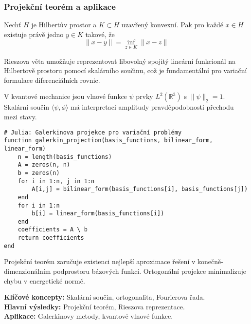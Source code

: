 \subsubsection{Projekční teorém a aplikace}

\begin{theorem}
Nechť $H$ je Hilbertův prostor a $K \subset H$ uzavřený konvexní. Pak pro každé $x \in H$ existuje právě jedno $y \in K$ takové, že
\[
\|x - y\| = \inf_{z \in K} \|x - z\|
\]
\end{theorem}

\begin{keyinsight}
Rieszova věta umožňuje reprezentovat libovolný spojitý lineární funkcionál na Hilbertově prostoru pomocí skalárního součinu, což je fundamentální pro variační formulace diferenciálních rovnic.
\end{keyinsight}

\begin{example}
V kvantové mechanice jsou vlnové funkce $\psi$ prvky $L^2(\mathbb{R}^3)$ s $\|\psi\|_2 = 1$. Skalární součin $\langle \psi, \phi \rangle$ má interpretaci amplitudy pravděpodobnosti přechodu mezi stavy.
\end{example}

\begin{application}
\begin{verbatim}
# Julia: Galerkinova projekce pro variační problémy
function galerkin_projection(basis_functions, bilinear_form, linear_form)
    n = length(basis_functions)
    A = zeros(n, n)
    b = zeros(n)
    for i in 1:n, j in 1:n
        A[i,j] = bilinear_form(basis_functions[i], basis_functions[j])
    end
    for i in 1:n
        b[i] = linear_form(basis_functions[i])
    end
    coefficients = A \ b
    return coefficients
end
\end{verbatim}
Projekční teorém zaručuje existenci nejlepší aproximace řešení v konečně-dimenzionálním podprostoru bázových funkcí. Ortogonální projekce minimalizuje chybu v energetické normě.
\end{application}

\begin{summary}
\textbf{Klíčové koncepty:} Skalární součin, ortogonalita, Fourierova řada. \\
\textbf{Hlavní výsledky:} Projekční teorém, Rieszova reprezentace. \\
\textbf{Aplikace:} Galerkinovy metody, kvantové vlnové funkce.
\end{summary}

